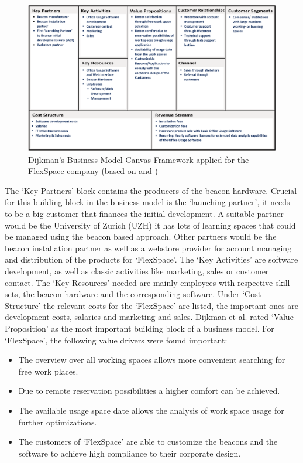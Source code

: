 			\begin{figure}[ht]
			    \begin{center}
			    \includegraphics[scale=0.35]{Talk11/bmc_flex.png}
			    \end{center}
			    \caption{Dijkman's Business Model Canvas Framework applied for the FlexSpace company (based on \cite{dijkman} and \cite{bmc})}
			    \label{fig:bmc_flex}
			\end{figure}
	The `Key Partners' block contains the producers of the beacon hardware. Crucial for this building block in the business model is the `launching partner', it needs to be a big customer that finances the initial development. A suitable partner would be the University of Zurich (UZH) it has lots of learning spaces that could be managed using the beacon based approach. Other partners would be the beacon installation partner as well as a webstore provider for account managing and distribution of the products for `FlexSpace'. The `Key Activities' are software development, as well as classic activities like marketing, sales or customer contact. The `Key Resources' needed are mainly employees with respective skill sets, the beacon hardware and the corresponding software. Under `Cost Structure' the relevant costs for the `FlexSpace' are listed, the important ones are development costs, salaries and marketing and sales. Dijkman et al. \cite{dijkman}  rated `Value Proposition' as the most important building block of a business model. For `FlexSpace', the following value drivers were found important:

	\begin{itemize}
		\item The overview over all working spaces allows more convenient searching for free work places.
		\item Due to remote reservation possibilities a higher comfort can be achieved. 
		\item The available usage space date allows the analysis of work space usage for further optimizations.
		\item The customers of `FlexSpace' are able to customize the beacons and the software to achieve high compliance to their corporate design.  
	\end{itemize}  

